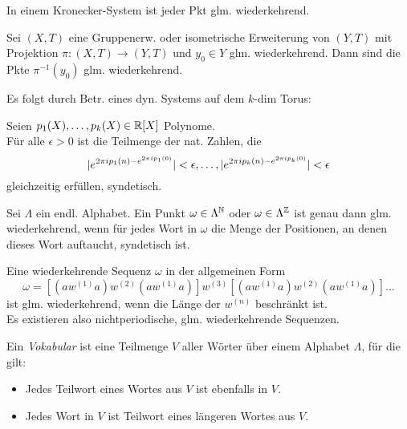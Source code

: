 \documentclass{cheat-sheet}
\begin{document}
\begin{thm}
  In einem Kronecker-System ist jeder Pkt glm. wiederkehrend.
\end{thm}

\begin{thm}
  Sei $(X, T)$ eine Gruppenerw. oder isometrische Erweiterung von $(Y, T)$ mit Projektion $\pi : (X, T) \to (Y, T)$ und $y_0 \in Y$ glm. wiederkehrend.
  Dann sind die Pkte $\pi^{-1}(y_0)$ glm. wiederkehrend.
\end{thm}

\begin{bem}
  Es folgt durch Betr. eines dyn. Systems auf dem $k$-dim Torus:
\end{bem}

\begin{thm}
  Seien $p_1(X), \ldots, p_k(X) \in \mathbb{R}[X]$ Polynome. \\
  Für alle $\epsilon > 0$ ist die Teilmenge der nat. Zahlen, die
  \[
    \lvert e^{2 \pi i p_1(n) - e^{2 \pi i p_1(0)}}\rvert < \epsilon, \ldots,
    \lvert e^{2 \pi i p_k(n) - e^{2 \pi i p_k(0)}}\rvert < \epsilon
  \]
  gleichzeitig erfüllen, syndetisch.
\end{thm}


\begin{prop}
  Sei $\Lambda$ ein endl. Alphabet. Ein Punkt $\omega \in \Lambda^{\mathbb{N}}$ oder $\omega \in \Lambda^{\mathbb{Z}}$ ist genau dann glm. wiederkehrend, wenn für jedes Wort in $\omega$ die Menge der Positionen, an denen dieses Wort auftaucht, syndetisch ist.
\end{prop}

\begin{bem}
  Eine wiederkehrende Sequenz $\omega$ in der allgemeinen Form
  \[ \omega = [(aw^{(1)}a)w^{(2)}(aw^{(1)}a)]w^{(3)}[(aw^{(1)}a)w^{(2)}(aw^{(1)}a)]\ldots \]
  ist glm. wiederkehrend, wenn die Länge der $w^{(n)}$ beschränkt ist. \\
  Es existieren also nichtperiodische, glm. wiederkehrende Sequenzen.
\end{bem}

\begin{defn}
  Ein \emph{Vokabular} ist eine Teilmenge $V$ aller Wörter über einem Alphabet $\Lambda$, für die gilt:
  \begin{itemize}
    \item Jedes Teilwort eines Wortes aus $V$ ist ebenfalls in $V$.
    \item Jedes Wort in $V$ ist Teilwort eines längeren Wortes aus $V$.
  \end{itemize}
\end{defn}
\end{document}
